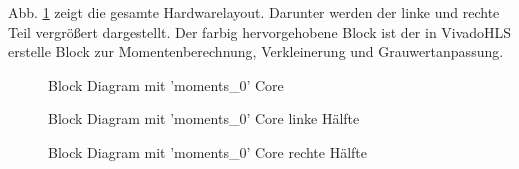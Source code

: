 \documentclass[a4paper]{report}
\begin{document}
Abb. \ref{fig:BlockFull} zeigt die gesamte Hardwarelayout. Darunter werden der linke und rechte Teil vergrößert dargestellt. Der farbig hervorgehobene Block ist der in VivadoHLS erstelle Block zur Momentenberechnung, Verkleinerung und Grauwertanpassung.

\begin{figure}[H]
\centering
{}
\caption{Block Diagram mit 'moments\_0' Core}
\label{fig:BlockFull}
\end{figure}

\begin{figure}[H]
\centering
{}
\caption{Block Diagram mit 'moments\_0' Core linke Hälfte}
\label{fig:BlockLeft}
\end{figure}

\begin{figure}[H]
\centering
{}
\caption{Block Diagram mit 'moments\_0' Core rechte Hälfte}
\label{fig:BlockRight}
\end{figure}
\end{document}
